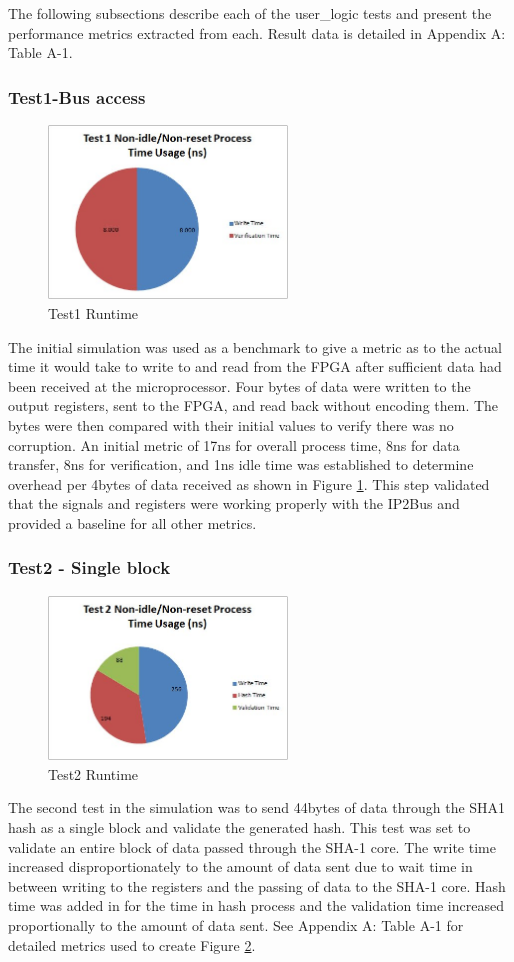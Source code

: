 \documentclass[journal]{IEEEtran}
\begin{document}
The following subsections describe each of the user\_logic tests and present the performance metrics extracted from each.  Result data is detailed in Appendix A: Table A-1.
\subsubsection{Test1-Bus access}
\begin{figure}[ht]
\centering
\includegraphics[width=2.5in]{Test1.jpg}
\caption{Test1 Runtime}
\label{fig_test1Runtime}
\end{figure}
The initial simulation was used as a benchmark to give a metric as to the actual time it would take to write to and read from the FPGA after sufficient data had been received at the microprocessor.  Four bytes of data were written to the output registers, sent to the FPGA, and read back without encoding them.  The bytes were then compared with their initial values to verify there was no corruption.  An initial metric of 17ns for overall process time, 8ns for data transfer, 8ns for verification, and 1ns idle time was established to determine overhead per 4bytes of data received as shown in Figure \ref{fig_test1Runtime}.  This step validated that the signals and registers were working properly with the IP2Bus and provided a baseline for all other metrics.
\subsubsection{Test2 - Single block}
\begin{figure}[ht]
\centering
\includegraphics[width=2.5in]{Test2.jpg}
\caption{Test2 Runtime}
\label{fig_test2Runtime}
\end{figure} 
The second test in the simulation was to send 44bytes of data through the SHA1 hash as a single block and validate the generated hash.  This test was set to validate an entire block of data passed through the SHA-1 core.  The write time increased disproportionately to the amount of data sent due to wait time in between writing to the registers and the passing of data to the SHA-1 core.  Hash time was added in for the time in hash process and the validation time increased proportionally to the amount of data sent.  See Appendix A: Table A-1 for detailed metrics used to create Figure \ref{fig_test2Runtime}.
\end{document}
